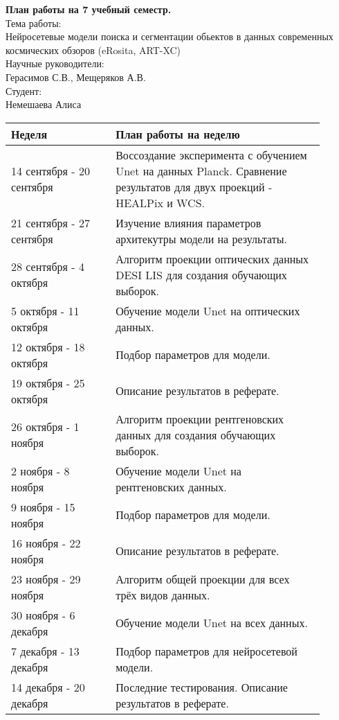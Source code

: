 \documentclass{article}
\begin{document}
\textbf{План работы на 7 учебный семестр.}\\
Тема работы:\\
Нейросетевые модели поиска и сегментации обьектов в данных современных космических обзоров (eRosita, ART-XC)\\
Научные руководители:\\
Герасимов С.В., Мещеряков А.В.\\
Студент:\\
Немешаева Алиса\\
    \begin{table}[h!]
        \begin{tabular}{|p{0.3\linewidth}|p{0.6\linewidth}|}
            \hline
            \textbf{Неделя} & \textbf{План работы на неделю}\\
            \hline
            14 сентября - 20 сентября & Воссоздание эксперимента с обучением Unet на данных 
                Planck. Сравнение результатов для двух проекций - HEALPix и WCS.\\ 
            21 сентября - 27 сентября & Изучение влияния параметров архитекутры модели на результаты.\\
            28 сентября - 4 октября & Алгоритм проекции оптических данных DESI LIS для создания 
                обучающих выборок.\\
            5 октября - 11 октября & Обучение модели Unet на оптических данных. \\
            12 октября - 18 октября & Подбор параметров для модели.\\
            19 октября - 25 октября & Описание результатов в реферате.\\
            26 октября - 1 ноября & Алгоритм проекции рентгеновских данных для создания обучающих 
                выборок.\\
            2 ноября - 8 ноября & Обучение модели Unet на рентгеновских данных.\\
            9 ноября - 15 ноября & Подбор параметров для модели.\\
            16 ноября - 22 ноября & Описание результатов в реферате.\\
            23 ноября - 29 ноября & Алгоритм общей проекции для всех трёх видов данных.\\
            30 ноября - 6 декабря & Обучение модели Unet на всех данных.\\
            7 декабря - 13 декабря & Подбор параметров для нейросетевой модели.\\
            14 декабря - 20 декабря & Последние тестирования. Описание результатов в реферате.\\
            \hline
        \end{tabular}
    \end{table}
\end{document}
